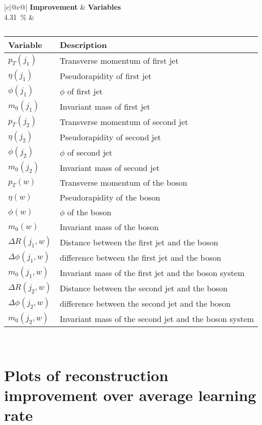 \begin{table}[h]
    \centering
    \label{tab:app_vars_1}
    \caption{}
    \begin{tabular}{ |c|@{}c@{}| }
        \hline
        \textbf{Improvement} & \textbf{Variables}\\
        \hline
        \SI{4.31}{\%} & 
        \begin{tabular}{ll}
            \hline
            Variable & Description\\
            \hline
            $p_T(j_1)$ & Transverse momentum of first jet\\
            $\eta(j_1)$ & Pseudorapidity of first jet\\
            $\phi(j_1)$ & $\phi$ of first jet\\
            $m_0(j_1)$ & Invariant mass of first jet\\

            $p_T(j_2)$ & Transverse momentum of second jet\\
            $\eta(j_2)$ & Pseudorapidity of second jet\\
            $\phi(j_2)$ & $\phi$ of second jet\\
            $m_0(j_2)$ & Invariant mass of second jet\\
            
            $p_T(w)$ & Transverse momentum of the \PWplus boson\\
            $\eta(w)$ & Pseudorapidity of the \PWplus boson\\
            $\phi(w)$ & $\phi$ of the \PWplus boson\\
            $m_0(w)$ & Invariant mass of the \PWplus boson\\

            $\Delta R(j_1, w)$ & Distance between the first jet and the \PWplus boson\\
            $\Delta \phi(j_1, w)$ & \phi difference between the first jet and the \PWplus boson\\
            $m_0(j_1, w)$ & Invariant mass of the first jet and the \PWplus boson system\\
            
            $\Delta R(j_2, w)$ & Distance between the second jet and the \PWplus boson\\
            $\Delta \phi(j_2, w)$ & \phi difference between the second jet and the \PWplus boson\\
            $m_0(j_2, w)$ & Invariant mass of the second jet and the \PWplus boson system\\
            \hline
        \end{tabular}\\
        \hline
    \end{tabular}
\end{table}

\chapter{Plots of reconstruction improvement over average learning rate}